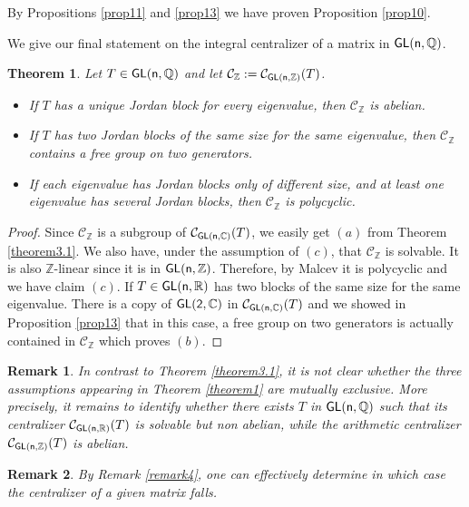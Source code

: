\documentclass[a4paper,11pt]{article}
\newtheorem{theorem}{Theorem}[section]
\newtheorem{remark}{Remark}[section]
\theoremstyle{definition}
\newcommand{\Z}{\mathbb Z}
\newcommand{\Q}{\mathbb Q}
\newcommand{\C}{\mathcal C}
\newcommand{\R}{\mathbb R}
\def \GL{\sf{GL}}
\begin{document}
By Propositions \ref{prop11} and \ref{prop13} we have proven Proposition \ref{prop10}.

We give our final statement on the integral centralizer of a matrix in $ \GL(n,\Q
)$.
\begin{theorem}
Let $T \in \GL(n, \Q)$ and let $\C_{\Z}:=\C_{\GL(n,\Z)}(T)$.
\begin{itemize}
\item[\rm (a)]
If $T$ has a unique Jordan block for every eigenvalue, then $\C_{\Z}$ is abelian.
\item[\rm (b)]
If $T$ has two Jordan blocks of the same size for the same eigenvalue, then $\C_{\Z}$ contains a free group on two generators.
\item[\rm (c)]
If each eigenvalue has Jordan blocks only of different size, and at least one
eigenvalue has several Jordan blocks, then $\C_{\Z}$ is polycyclic.
\end{itemize}
\end{theorem}

\begin{proof}
  Since $\C_{\Z}$ is a subgroup of $\C_{\GL(n,\mathbb{C})}(T)$, we easily get $(a)$ from Theorem \ref{theorem3.1}. We also have, under the assumption of $(c)$, that $\C_{\Z}$ is solvable. It is also $\Z$-linear since it is in $\GL(n,\Z)$. Therefore, by Malcev \cite{mal1951certain} it is polycyclic and we have claim $(c)$.
    If $T \in \GL(n,\R)$ has two  blocks of the same size for the same eigenvalue. There is a copy of $\GL(2,\mathbb{C})$ in $\C_{\GL(n,\mathbb{C})}(T)$ and we showed in Proposition \ref{prop13} that in this case, a free group on two generators is actually contained in $\C_{\Z}$ which proves $(b)$. 
\end{proof}



\begin{remark}
    In contrast to Theorem \ref{theorem3.1}, it is not clear whether the three assumptions appearing in Theorem \ref{theorem1} are mutually exclusive. More precisely, it remains to identify whether there exists $T$ in $\GL(n,\Q)$  such that its centralizer $\C_{\GL(n,\R)}(T)$ is solvable but non abelian, while the arithmetic centralizer $\C_{\GL(n,\Z)}(T)$ is abelian.
\end{remark}

\begin{remark}

By Remark \ref{remark4}, one can effectively determine in which case the centralizer of a given matrix falls. 

\end{remark}
\end{document}
